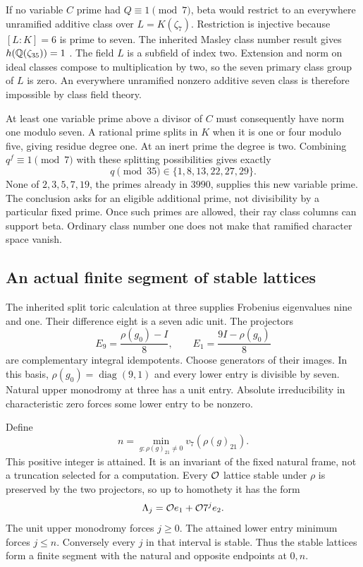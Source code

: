 If no variable $C$ prime had $Q\equiv1\pmod7$, beta would restrict to an everywhere unramified additive class over $L=K(\zeta_7)$. Restriction is injective because $[L:K]=6$ is prime to seven. The inherited Masley class number result gives $h(\mathbb Q(\zeta_{35}))=1$ \cite{masley1976}. The field $L$ is a subfield of index two. Extension and norm on ideal classes compose to multiplication by two, so the seven primary class group of $L$ is zero. An everywhere unramified nonzero additive seven class is therefore impossible by class field theory.

At least one variable prime above a divisor of $C$ must consequently have norm one modulo seven. A rational prime splits in $K$ when it is one or four modulo five, giving residue degree one. At an inert prime the degree is two. Combining $q^f\equiv1\pmod7$ with these splitting possibilities gives exactly
\[
q\pmod{35}\in\{1,8,13,22,27,29\}.
\]
None of $2,3,5,7,19$, the primes already in $3990$, supplies this new variable prime. The conclusion asks for an eligible additional prime, not divisibility by a particular fixed prime. Once such primes are allowed, their ray class columns can support beta. Ordinary class number one does not make that ramified character space vanish.

\subsection{An actual finite segment of stable lattices}
The inherited split toric calculation at three supplies Frobenius eigenvalues nine and one. Their difference eight is a seven adic unit. The projectors
\[
E_9=\frac{\rho(g_0)-I}{8},\qquad E_1=\frac{9I-\rho(g_0)}8
\]
are complementary integral idempotents. Choose generators of their images. In this basis, $\rho(g_0)=\operatorname{diag}(9,1)$ and every lower entry is divisible by seven. Natural upper monodromy at three has a unit entry. Absolute irreducibility in characteristic zero forces some lower entry to be nonzero.

Define
\begin{equation}\label{eq:actualdepth}
n=\min_{g:\rho(g)_{21}\ne0}v_7(\rho(g)_{21}).
\end{equation}
This positive integer is attained. It is an invariant of the fixed natural frame, not a truncation selected for a computation. Every $\mathcal O$ lattice stable under $\rho$ is preserved by the two projectors, so up to homothety it has the form
\[
\Lambda_j=\mathcal O e_1+\mathcal O 7^j e_2.
\]
The unit upper monodromy forces $j\ge0$. The attained lower entry minimum forces $j\le n$. Conversely every $j$ in that interval is stable. Thus the stable lattices form a finite segment with the natural and opposite endpoints at $0,n$.

